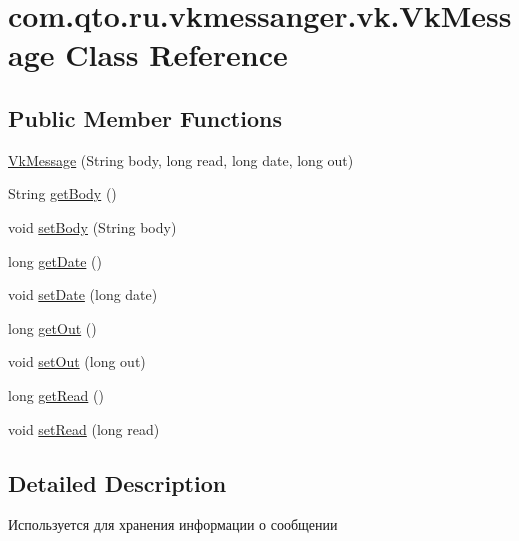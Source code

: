 \hypertarget{classcom_1_1qto_1_1ru_1_1vkmessanger_1_1vk_1_1_vk_message}{}\section{com.\+qto.\+ru.\+vkmessanger.\+vk.\+Vk\+Message Class Reference}
\label{classcom_1_1qto_1_1ru_1_1vkmessanger_1_1vk_1_1_vk_message}
\subsection*{Public Member Functions}
\begin{DoxyCompactItemize}
\item 
\hyperlink{classcom_1_1qto_1_1ru_1_1vkmessanger_1_1vk_1_1_vk_message_a0729a2f63bd914a8f4d207cbe7e54a3e}{Vk\+Message} (String body, long read, long date, long out)
\item 
String \hyperlink{classcom_1_1qto_1_1ru_1_1vkmessanger_1_1vk_1_1_vk_message_a750fc0d995fd3a7a701fdbf154b8a990}{get\+Body} ()
\item 
void \hyperlink{classcom_1_1qto_1_1ru_1_1vkmessanger_1_1vk_1_1_vk_message_aefbcc1b35e89ccbdf92e00c2c0a7d5a9}{set\+Body} (String body)
\item 
long \hyperlink{classcom_1_1qto_1_1ru_1_1vkmessanger_1_1vk_1_1_vk_message_a0e125549e562c05bd6c9980fd73c1418}{get\+Date} ()
\item 
void \hyperlink{classcom_1_1qto_1_1ru_1_1vkmessanger_1_1vk_1_1_vk_message_aee334706090e5bd04e9aa80cdd137196}{set\+Date} (long date)
\item 
long \hyperlink{classcom_1_1qto_1_1ru_1_1vkmessanger_1_1vk_1_1_vk_message_a888ec03dab5cee285dc234078cda319f}{get\+Out} ()
\item 
void \hyperlink{classcom_1_1qto_1_1ru_1_1vkmessanger_1_1vk_1_1_vk_message_af7a885d34e2beba7da92e27813e7a673}{set\+Out} (long out)
\item 
long \hyperlink{classcom_1_1qto_1_1ru_1_1vkmessanger_1_1vk_1_1_vk_message_a19c7dd11da446db5bb66a16226ba016a}{get\+Read} ()
\item 
void \hyperlink{classcom_1_1qto_1_1ru_1_1vkmessanger_1_1vk_1_1_vk_message_a21de2d57d93d0da042a80509172b7d56}{set\+Read} (long read)
\end{DoxyCompactItemize}


\subsection{Detailed Description}
Используется для хранения информации о сообщении 

